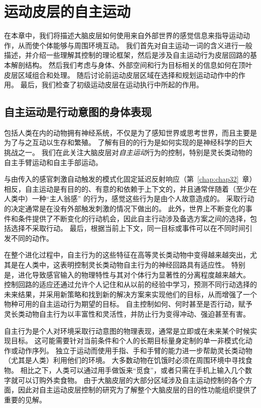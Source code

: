 \chapter{运动皮层的自主运动} \label{chap:chap34}


在本章中，我们将描述大脑皮层如何使用来自外部世界的感觉信息来指导运动动作，从而使个体能够与周围环境互动。
我们首先对自主运动一词的含义进行一般描述，并介绍一些理解其控制的理论框架，然后是涉及自主运动行为皮层回路的基本解剖结构。
然后我们考虑与身体、外部空间和行为目标相关的信息如何在顶叶皮层区域组合和处理。
随后讨论前运动皮层区域在选择和规划运动动作中的作用。
最后，我们检查了初级运动皮层在运动执行中所起的作用。



\section{自主运动是行动意图的身体表现}

包括人类在内的动物拥有神经系统，不仅是为了感知世界或思考世界，而且主要是为了与之互动以生存和繁殖。
了解有目的的行为是如何实现的是神经科学的巨大挑战之一。
我们在此关注大脑皮层对\textit{自主运动}行为的控制，特别是灵长类动物的自主手臂运动和自主手部运动。


与由传入的感官刺激自动触发的模式化固定延迟反射响应（第~\ref{chap:chap32}~章）相反，自主运动是有目的的、有意的和依赖于上下文的，并且通常伴随着（至少在人类中）一种“主人翁感” 的行为，感觉这些行为是由个人故意造成的。
采取行动的决定通常是在没有外部触发刺激的情况下做出的。
此外，世界上不断变化的事件和条件提供了不断变化的行动机会，因此自主行动涉及备选方案之间的选择，包括选择不采取行动。
最后，根据当前上下文，同一目标或事件可以在不同时间引发不同的动作。


在整个进化过程中，自主行为的这些特征在高等灵长类动物中变得越来越突出，尤其是在人类中，这表明控制灵长类动物自主行为的神经回路具有适应性。
特别是，进化导致感官输入的物理特性与其对个体行为显著性的分离程度越来越大。
控制回路的适应还通过允许个人记住和从以前的经验中学习，预测不同行动选择的未来结果，并采用新策略和找到新的解决方案来实现他们的目标，从而增强了一个物种可用的自主运动行为期望的目标。
自主控制如何、何时甚至是否行动，赋予灵长类动物自主行为以丰富性和灵活性，并防止行为变得冲动、强迫甚至有害。


自主行为是个人对环境采取行动意图的物理表现，通常是立即或在未来某个时候实现目标。
这可能需要针对当前条件和个人的长期目标量身定制的单一非模式化动作或动作序列。
独立于运动而使用手指、手和手臂的能力进一步帮助灵长类动物（尤其是人类）利用他们的环境。
大多数动物在饥饿时必须在周围环境中寻找食物。
相比之下，人类可以通过用手做饭来“觅食”，或者只需在手机上输入几个数字就可以订购外卖食物。
由于大脑皮层的大部分区域涉及自主运动控制的各个方面，因此对自主运动皮层控制的研究为了解整个大脑皮层的目的性功能组织提供了重要的见解。



